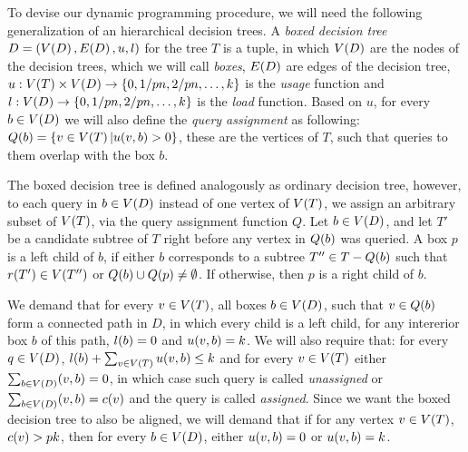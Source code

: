 

To devise our dynamic programming procedure, we will need the following generalization of an hierarchical decision trees. A \textit{boxed decision tree} $D=\mathopen{}\left( V\mathopen{}\left( D \right), E\mathopen{}\left( D \right), u, l \right)$ for the tree $T$ is a tuple, in which $V\mathopen{}\left( D \right)$ are the nodes of the decision trees, which we will call \textit{boxes}, $E\mathopen{}\left( D \right)$ are edges of the decision tree, $u:V\mathopen{}\left( T \right)\times V\mathopen{}\left( D \right)\to \mathopen{}\left\{ 0, 1/pn,2/pn,\dots,k \right\}$ is the \textit{usage} function and $l:V\mathopen{}\left( D \right)\to\mathopen{}\left\{ 0, 1/pn,2/pn,\dots,k \right\}$ is the \textit{load} function. Based on $u$, for every $b\in V\mathopen{}\left( D \right)$ we will also define the \textit{query assignment} as following: $Q\mathopen{}\left( b \right)=\mathopen{}\left\{ v\in V\mathopen{}\left( T \right)|u\mathopen{}\left( v,b \right)>0 \right\}$, these are the vertices of $T$, such that queries to them overlap with the box $b$.

The boxed decision tree is defined analogously as ordinary decision tree, however, to each query in $b\in V\mathopen{}\left( D \right)$ instead of one vertex of $V\mathopen{}\left( T \right)$, we assign an arbitrary subset of $V\mathopen{}\left( T \right)$, via the query assignment function $Q$. Let $b\in V\mathopen{}\left( D \right)$, and let $T'$ be a candidate subtree of $T$ right before any vertex in $Q\mathopen{}\left( b \right)$ was queried. A box $p$ is a left child of $b$, if either $b$ corresponds to a subtree $T''\in T-Q\mathopen{}\left( b \right)$ such that $r\mathopen{}\left( T' \right)\in V\mathopen{}\left( T'' \right)$ or $Q\mathopen{}\left( b \right)\cup Q\mathopen{}\left( p \right)\neq \emptyset$. If otherwise, then $p$ is a right child of $b$.

We demand that for every $v\in V\mathopen{}\left( T \right)$, all boxes $b\in V\mathopen{}\left( D \right)$, such that $v\in Q\mathopen{}\left( b \right)$ form a connected path in $D$, in which every child is a left child, for any intererior box $b$ of this path, $l\mathopen{}\left( b \right)=0$ and $u\mathopen{}\left( v,b \right)=k$. We will also require that: for every $q\in V\mathopen{}\left( D \right)$, $l\mathopen{}\left( b \right)+\sum_{v\in V\mathopen{}\left( T \right)}u\mathopen{}\left( v,b \right)\leq k$ and for every $v\in V\mathopen{}\left( T \right)$ either $\sum_{b\in V\mathopen{}\left( D \right)}\mathopen{}\left( v,b \right)=0$, in which case such query is called \textit{unassigned} or $\sum_{b\in V\mathopen{}\left( D \right)}\mathopen{}\left( v,b \right)=c\mathopen{}\left( v \right)$ and the query is called \textit{assigned}. Since we want the boxed decision tree to also be aligned, we will demand that if for any vertex $v\in V\mathopen{}\left( T \right)$, $c\mathopen{}\left( v \right)>pk$, then for every $b\in V\mathopen{}\left( D \right)$, either $u\mathopen{}\left( v,b \right)=0$ or $u\mathopen{}\left( v,b \right)=k$. 

